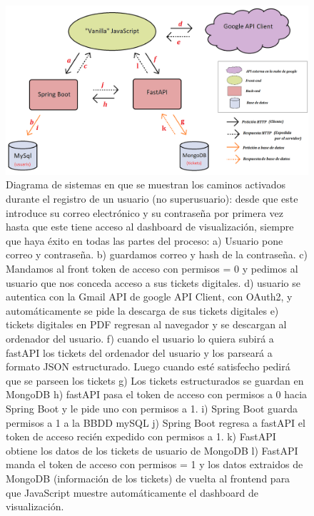 \documentclass[a4paper,12pt]{report}
\begin{document}
				
				\setlength{\belowcaptionskip}{3pt}
				\FloatBarrier
				\begin{figure}[H]
					\centering
					\includegraphics[width=1\textwidth]{img/diagramaSistemesAplicacioMercappCAMIREGISTREbo.png}
					\caption{Diagrama de sistemas en que se muestran los caminos activados durante el registro de un usuario (no superusuario): desde que este introduce su correo electrónico y su contraseña por primera vez hasta que este tiene acceso al dashboard de visualización, siempre que haya éxito en todas las partes del proceso: a) Usuario pone correo y contraseña. b) guardamos correo y hash de la contraseña. c) Mandamos al front token de acceso con permisos = 0 y pedimos al usuario que nos conceda acceso a sus tickets digitales. d) usuario se autentica con la Gmail API de google API Client, con OAuth2, y automáticamente se pide la descarga de sus tickets digitales e) tickets digitales en PDF regresan al navegador y se descargan al ordenador del usuario. f) cuando el usuario lo quiera subirá a fastAPI los tickets del ordenador del usuario y los parseará a formato JSON estructurado. Luego cuando esté satisfecho pedirá que se parseen los tickets g) Los tickets estructurados se guardan en MongoDB h) fastAPI pasa el token de acceso con permisos a 0 hacia Spring Boot y le pide uno con permisos a 1. i) Spring Boot guarda permisos a 1 a la BBDD mySQL j) Spring Boot regresa a fastAPI el token de acceso recién expedido con permisos a 1. k) FastAPI obtiene los datos de los tickets de usuario de MongoDB l) FastAPI manda el token de acceso con permisos = 1 y los datos extraidos de MongoDB (información de los tickets) de vuelta al frontend para que JavaScript muestre automáticamente el dashboard de visualización.}
					\label{fig:diagramaSistemesAplicacioMercappCAMIREGISTRE} 
				\end{figure}
				\FloatBarrier
				
\end{document}
